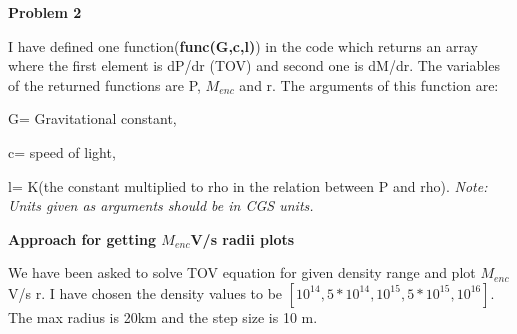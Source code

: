 \documentclass{article}
\begin{document}
\vspace{1.5em}
\textbf{Problem 2}\vspace{1.5em}

I have defined one function(\textbf{func(G,c,l)}) in the code which returns an array where the first element is dP/dr (TOV) and second one is dM/dr. The variables of the returned functions are P, $M_{enc}$ and r.
    The arguments of this function are:
      \vspace{0.2em}
      
        G= Gravitational constant,
          \vspace{0.2em}
          
        c= speed of light,
          \vspace{0.2em}
          
        l= K(the constant multiplied to rho in the relation between P and rho).
          \vspace{0.2em}
        \emph{Note: Units given as arguments should be in CGS units.}
  
  \vspace{0.2em}
  
 \textbf{Approach for getting $M_{enc}$V/s radii plots}
 
 We have been asked to solve TOV equation for given density range and plot $M_{enc}$ V/s r. I have chosen the density values to be $[10^{14}, 5*10^{14}, 10^{15}, 5*10^{15},10^{16}]$. The max radius is 20km and the step size is 10 m. 
 
\end{document}
